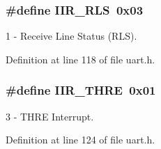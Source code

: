 \subsubsection[{\texorpdfstring{I\+I\+R\+\_\+\+R\+LS}{IIR_RLS}}]{\setlength{\rightskip}{0pt plus 5cm}\#define I\+I\+R\+\_\+\+R\+LS~0x03}\hypertarget{group___i_n_t_i_d_ga03db7def835d2e60f1cc7470bdf35b08}{}\label{group___i_n_t_i_d_ga03db7def835d2e60f1cc7470bdf35b08}


1 -\/ Receive Line Status (R\+LS). 



Definition at line 118 of file uart.\+h.

\subsubsection[{\texorpdfstring{I\+I\+R\+\_\+\+T\+H\+RE}{IIR_THRE}}]{\setlength{\rightskip}{0pt plus 5cm}\#define I\+I\+R\+\_\+\+T\+H\+RE~0x01}\hypertarget{group___i_n_t_i_d_gafbff8bd626a8fce1f6082d355000c2b2}{}\label{group___i_n_t_i_d_gafbff8bd626a8fce1f6082d355000c2b2}


3 -\/ T\+H\+RE Interrupt. 



Definition at line 124 of file uart.\+h.

